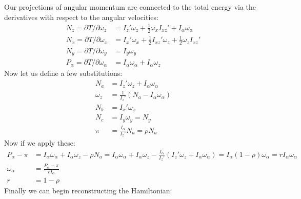 \documentclass{article}
\begin{document}
Our projections of angular momentum are connected to the total energy via the derivatives with respect to the angular velocities:
\begin{align}
	N_{z} = \partial T/\partial\omega_{z} &= I_{z}'\omega_{z} + \frac{1}{2}\omega_{x}I_{xz}' + I_{\alpha}\omega_{\alpha}  \\
	N_{x} = \partial T/\partial\omega_{x} &= I_{x}'\omega_{x} + \frac{1}{2}I_{xz}'\omega_{z} + \frac{1}{2}\omega_{z}I_{xz}' \\
	N_{y} = \partial T/\partial\omega_{y} &= I_{y}\omega_{y} \\
	P_{\alpha} = \partial T/\partial\omega_{\alpha} &= I_{\alpha}\omega_{\alpha} + I_{\alpha}\omega_{z}
\end{align}
Now let us define a few substitutions:
\begin{align}
	N_{a} &= I_{z}'\omega_{z} + I_{\alpha}\omega_{\alpha} \\
	\omega_{z} &= \frac{1}{I_{z}'}\left( N_{a} - I_{\alpha}\omega_{\alpha} \right) \\
	N_{b} &= I_{x}'\omega_{x} \\
	N_{c} &= I_{y}\omega_{y} = N_{y} \\
	\pi &= \frac{I_{\alpha}}{I_{z}'}N_{a} = \rho N_{a}
\end{align}
Now if we apply these:
\begin{align}
	P_{\alpha} - \pi &= I_{\alpha}\omega_{\alpha} + I_{\alpha}\omega_{z} - \rho N_{a} = I_{\alpha}\omega_{\alpha} + I_{\alpha}\omega_{z}- \frac{I_{\alpha}}{I_{z}'}(I_{z}'\omega_{z} + I_{\alpha}\omega_{\alpha}) = I_{\alpha}(1 - \rho)\omega_{\alpha} = rI_{\alpha}\omega_{\alpha} \\
	\omega_{\alpha} &= \frac{P_{\alpha}-\pi}{rI_{\alpha}} \\
	r &= 1 - \rho
\end{align}
Finally we can begin reconstructing the Hamiltonian:
\end{document}
